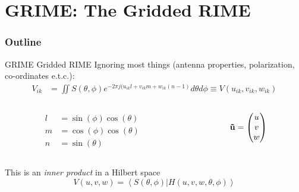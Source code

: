\documentclass[ignorenonframetext]{beamer}
\begin{document}
\section{GRIME: The Gridded RIME}

\begin{frame}
\frametitle{Outline}
\tableofcontents[currentsection]
\end{frame}


\begin{frame}{GRIME Gridded RIME}
 Ignoring most things (antenna properties, polarization, co-ordinates e.t.c.):
 \begin{align}
      V_{ik} &= \iint S(\theta, \phi) e^{-2 \pi j (u_{ik} l + v_{ik} m + w_{ik}(n-1)} d \theta d \phi 
    \label{eqn:vis_theta_phi} 
    \equiv V(u_{ik}, v_{ik}, w_{ik}) 
 \end{align}
 \begin{columns}
  \begin{column}{0.5\linewidth}
   \begin{align*}
   l &= \sin(\phi) \cos(\theta) \\
    m &= \cos(\phi) \cos(\theta) \\
    n &= \sin(\theta)
  \end{align*}
  \end{column}
  \begin{column}{0.5\linewidth}
 \[ \mathbf{\vec{u}} = \begin{pmatrix} u \\ v \\ w \end{pmatrix} \]   
  \end{column}
 \end{columns}
 This is an {\em inner product} in a Hilbert space 
 \[ V(u, v, w) = \left<S(\theta, \phi) \right| \left. H(u, v, w, \theta, \phi)\right > \]
\end{frame}
\end{document}
